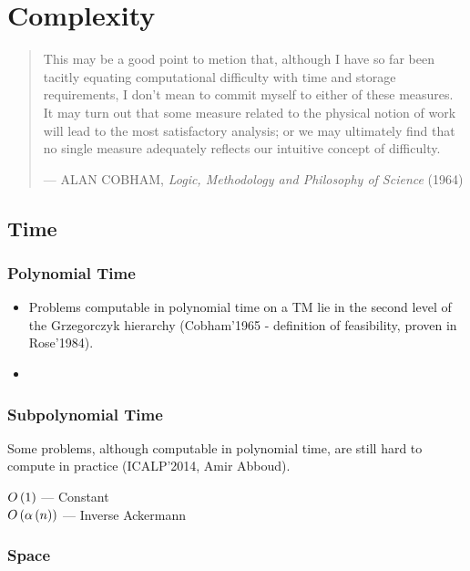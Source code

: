 
\chapter{Complexity}

\begin{quotation}

\footnotesize\sffamily\itshape

\begin{flushright}

This may be a good point to metion that, although I have so far been tacitly
equating computational difficulty with time and storage requirements, I don't
mean to commit myself to either of these measures. It may turn out that some
measure related to the physical notion of work will lead to the most
satisfactory analysis; or we may ultimately find that no single measure
adequately reflects our intuitive concept of difficulty.

\smallbreak

\upshape

--- ALAN COBHAM, {\itshape Logic, Methodology and Philosophy of Science} (1964)

\end{flushright}

\end{quotation}

\section{Time}

\subsection{Polynomial Time}

\begin{itemize}

\item Problems computable in polynomial time on a TM lie in the second level of
the Grzegorczyk hierarchy (Cobham'1965 - definition of feasibility, proven in Rose'1984). 

\item 

\end{itemize}

\subsection{Subpolynomial Time}

Some problems, although computable in polynomial time, are still hard to
compute in practice (ICALP'2014, Amir Abboud).

\begin{description}

\item[$O\left({1}\right)$ --- Constant]

\item[$O\left({\alpha\left({n}\right)}\right)$ --- Inverse Ackermann]

\end{description}

\subsection{Space}
